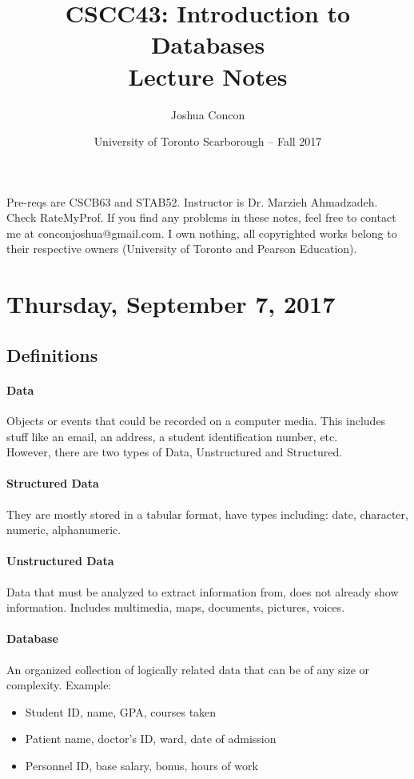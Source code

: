 \documentclass[12pt]{article}
\begin{document}
\title{CSCC43: Introduction to Databases\\ Lecture Notes}
\date{University of Toronto Scarborough -- Fall 2017}
\author{Joshua Concon}
\maketitle
Pre-reqs are CSCB63 and STAB52.
Instructor is Dr. Marzieh Ahmadzadeh. Check RateMyProf. If you find any problems in these notes, feel free to contact me at conconjoshua@gmail.com. I own nothing, all copyrighted works belong to their respective owners (University of Toronto and Pearson Education).

\tableofcontents

\pagebreak

\section{Thursday, September 7, 2017}

\subsection{Definitions}

\paragraph{Data} Objects or events that could be recorded on a computer media. This includes stuff like an email, an address, a student identification number, etc.\\

However, there are two types of Data, Unstructured and Structured.

\paragraph{Structured Data} They are mostly stored in a tabular format, have types including: date, character, numeric, alphanumeric.

\paragraph{Unstructured Data} Data that must be analyzed to extract information from, does not already show information. Includes multimedia, maps, documents, pictures, voices.

\paragraph{Database} An organized collection of logically related data that can be of any size or complexity. Example:
\begin{itemize}
	\item{Student ID, name, GPA, courses taken}
	\item{Patient name, doctor's ID, ward, date of admission}
	\item{Personnel ID, base salary, bonus, hours of work}
\end{itemize}
\end{document}
